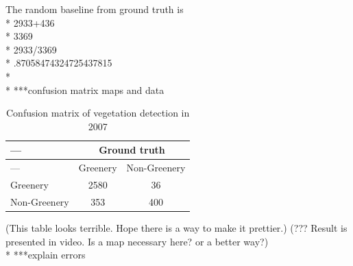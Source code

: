 The random baseline from ground truth is\\*
2933+436\\*
3369\\*
2933/3369\\*
.87058474324725437815\\*
\\*
***confusion matrix maps and data

\begin{table}[b]
\begin{center}
{\footnotesize{
\begin{tabular}{|l|c|c|}
\hline 
--- & \multicolumn{2}{c|}{Ground truth}\tabularnewline
\hline
--- & Greenery & Non-Greenery\tabularnewline
\hline 
\hline 
Greenery & 2580 & 36\tabularnewline
\hline 
Non-Greenery & 353 & 400\tabularnewline
\hline
\end{tabular}
}}
\caption{Confusion matrix of vegetation detection in 2007}
\label{tab:confusionmatrix}
\end{center}
\end{table}
(This table looks terrible. Hope there is a way to make it prettier.)
(??? Result is presented in video. Is a map necessary here? or a better way?)
\\*
***explain errors

